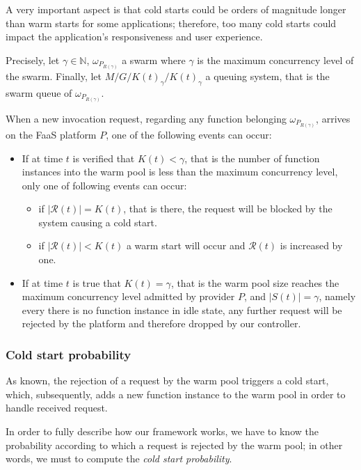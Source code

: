 \documentclass[10pt,a4paper]{report}
\newcommand*{\N}{\mathbb{N}}
\theoremstyle{definition}
\begin{document}
A very important aspect is that cold starts could be orders of magnitude longer than warm starts for some applications; therefore, too many cold starts could impact the application’s responsiveness and user experience.

Precisely, let $\gamma \in \N$, $\omega_{P_{R(\gamma)}}$ a swarm where $\gamma$ is the maximum concurrency level of the swarm. Finally, let $M/G/K(t)_{\gamma}/K(t)_{\gamma}$ a queuing system, that is the swarm queue of $\omega_{P_{R(\gamma)}}$. 

When a new invocation request, regarding any function belonging $\omega_{P_{R(\gamma)}}$, arrives on the FaaS platform $P$, one of the following events can occur:

\begin{itemize}
	\item If at time $t$ is verified that $K(t) < \gamma$, that is the number of function instances into the warm pool is less than the maximum concurrency level, only one of following events can occur:
	
	\begin{itemize}
		\item if $|\mathcal{R}(t)| = K(t)$, that is there, the request will be blocked by the system causing a cold start.
		
		\item if $|\mathcal{R}(t)| < K(t)$ a warm start will occur and $\mathcal{R}(t)$ is increased by one.
	\end{itemize}
	
	\item If at time $t$ is true that $K(t) = \gamma$, that is the warm pool size reaches the maximum concurrency level admitted by provider $P$, and $|S(t)| = \gamma$, namely every there is no function instance in idle state, any further request will be rejected by the platform and therefore dropped by our controller.
	
\end{itemize}

\subsubsection{Cold start probability}

As known, the rejection of a request by the warm pool triggers a cold start, which, subsequently, adds a new function instance to the warm pool in order to handle received request. 

In order to fully describe how our framework works, we have to know the probability according to which a request is rejected by the warm pool; in other words, we must to compute the \textit{cold start probability}. 
\end{document}
